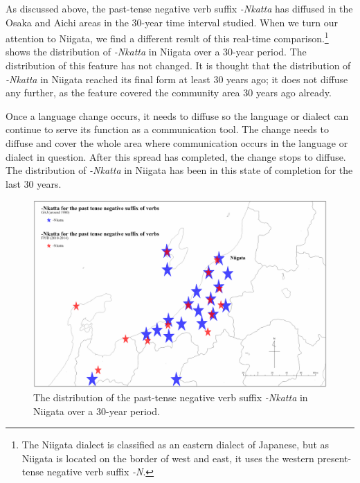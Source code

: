 \documentclass[output=paper]{LSP/langsci}
\begin{document}
As discussed above, the past-tense negative verb suffix \textit{-Nkatta} has diffused in the Osaka and Aichi areas in the 30-year time interval studied. When we turn our attention to Niigata, we find a different result of this real-time comparison.\footnote{ The Niigata dialect is classified as an eastern dialect of Japanese, but as Niigata is located on the border of west and east, it uses the western present-tense negative verb suffix \textit{-N}.}  shows the distribution of \textit{-Nkatta} in Niigata over a 30-year period. The distribution of this feature has not changed. It is thought that the distribution of \textit{-Nkatta} in Niigata reached its final form at least 30 years ago; it does not diffuse any further, as the feature covered the community area 30 years ago already.

Once a language change occurs, it needs to diffuse so the language or dialect can continue to serve its function as a communication tool. The change needs to diffuse and cover the whole area where communication occurs in the language or dialect in question. After this spread has completed, the change stops to diffuse. The distribution of \textit{-Nkatta} in Niigata has been in this state of completion for the last 30 years.



\begin{figure}
\includegraphics[width=\textwidth]{illustrations/onishi_fig8}
\caption{The distribution of the past-tense negative verb suffix \textit{-Nkatta} in Niigata over a 30-year period.}
\label{fig:8}
\end{figure}
\end{document}
